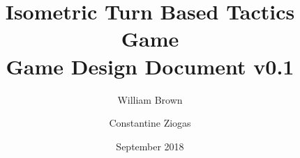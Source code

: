 \documentclass{article}
\title{Isometric Turn Based Tactics Game\\
       \large Game Design Document v0.1}
\author{William Brown \and Constantine Ziogas}
\date{September 2018}
\begin{document}
    \begin{titlepage}
        \maketitle
        \thispagestyle{empty}
    \end{titlepage}
    \newpage
    
    \tableofcontents
    \label{toc-contents}
    \newpage
    
    
    
    
    
    
    
    
    
    
    
    
\end{document}
